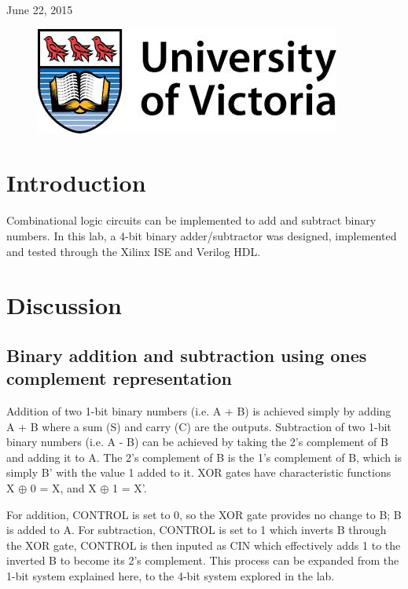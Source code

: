 \documentclass[11pt]{article}
\begin{document}
\begin{titlepage}
{\large June 22, 2015}\\ %

\begin{figure}[b]	 %
	\centering
	\includegraphics[scale=0.3]{UVic_logo}
\end{figure}

\end{titlepage}


\section{Introduction}

Combinational logic circuits can be implemented to add and subtract binary numbers. In this lab, a 4-bit binary adder/subtractor was designed, implemented and tested through the Xilinx ISE and Verilog HDL.  

\section{Discussion}

\subsection{Binary addition and subtraction using ones complement representation}

Addition of two 1-bit binary numbers (i.e. A + B) is achieved simply by adding A + B where a sum (S) and carry (C) are the outputs. Subtraction of two 1-bit binary numbers (i.e. A - B) can be achieved by taking the 2's complement of B and adding it to A. The 2's complement of B is the 1's complement of B, which is simply B' with the value 1 added to it. XOR gates have characteristic functions X $\oplus$ 0 = X, and  X $\oplus$  1 = X'. 

For addition, CONTROL is set to 0, so the XOR gate provides no change to B; B is added to A. For subtraction, CONTROL is set to 1 which inverts B through the XOR gate, CONTROL is then inputed as CIN which effectively adds 1 to the inverted B to become its 2's complement. This process can be expanded from the 1-bit system explained here, to the 4-bit system explored in the lab.
\end{document}
